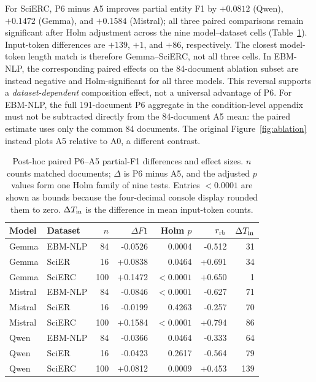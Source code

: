 \documentclass[fleqn,10pt]{wlscirep-authoryear}
\begin{document}
For SciERC, P6 minus A5 improves partial entity F1 by $+0.0812$ (Qwen),
$+0.1472$ (Gemma), and $+0.1584$ (Mistral); all three paired comparisons
remain significant after Holm adjustment across the nine model--dataset cells
(Table~\ref{tab:p6-a5-paired-all}). Input-token differences are $+139$,
$+1$, and $+86$, respectively. The closest model-token length match is therefore
Gemma--SciERC, not all three cells. In EBM-NLP, the corresponding paired effects
on the 84-document ablation subset are instead negative and Holm-significant
for all three models. This reversal supports a \emph{dataset-dependent}
composition effect, not a universal advantage of P6. For EBM-NLP, the full
191-document P6 aggregate in the condition-level appendix must not be
subtracted directly from the 84-document A5 mean: the paired estimate uses
only the common 84 documents. The original Figure~\ref{fig:ablation} instead
plots A5 relative to A0, a different contrast.

\begin{table}[t]
\centering
\caption{Post-hoc paired P6--A5 partial-F1 differences and effect sizes.
$n$ counts matched documents; $\Delta$ is P6 minus A5, and the adjusted
$p$ values form one Holm family of nine tests. Entries $<0.0001$ are
shown as bounds because the four-decimal console display rounded them to zero.
$\Delta T_{\rm in}$ is the difference in mean input-token counts.}
\label{tab:p6-a5-paired-all}
\begin{tabular}{llrrrrr}
\toprule
Model & Dataset & $n$ & $\Delta F1$ & Holm $p$ & $r_{\rm rb}$ & $\Delta T_{\rm in}$ \\
\midrule
Gemma & EBM-NLP & 84 & -0.0526 & 0.0004 & -0.512 & 31 \\
Gemma & SciER & 16 & +0.0838 & 0.0464 & +0.691 & 34 \\
Gemma & SciERC & 100 & +0.1472 & $<0.0001$ & +0.650 & 1 \\
Mistral & EBM-NLP & 84 & -0.0846 & $<0.0001$ & -0.627 & 71 \\
Mistral & SciER & 16 & -0.0199 & 0.4263 & -0.257 & 70 \\
Mistral & SciERC & 100 & +0.1584 & $<0.0001$ & +0.794 & 86 \\
Qwen & EBM-NLP & 84 & -0.0366 & 0.0464 & -0.333 & 64 \\
Qwen & SciER & 16 & -0.0423 & 0.2617 & -0.564 & 79 \\
Qwen & SciERC & 100 & +0.0812 & 0.0009 & +0.453 & 139 \\
\bottomrule
\end{tabular}
\end{table}
\end{document}
